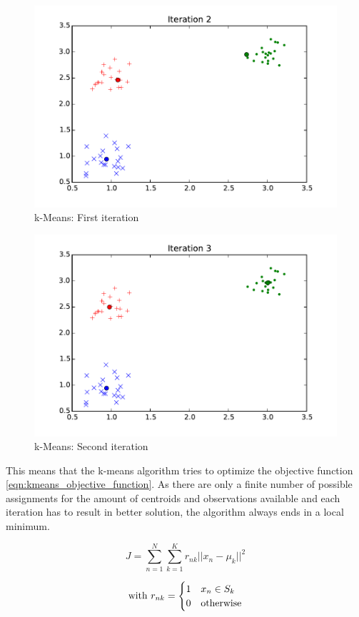 \begin{figure}
\includegraphics[width=0.7\linewidth]{images/iteration02}
\caption{k-Means: First iteration}
\label{fig:kmeans:iteration02}
\end{figure}

\begin{figure}
\includegraphics[width=0.7\linewidth]{images/iteration03}
\caption{k-Means: Second iteration}
\label{fig:kmeans:iteration03}
\end{figure}


This means that the k-means algorithm tries to optimize the objective function \ref{eqn:kmeans_objective_function}. As there are only a finite number of possible assignments for the amount of centroids and observations available and each iteration has to result in better solution, the algorithm always ends in a local minimum.

\begin{equation}
J = \sum_{n=1}^{N} \sum_{k=1}^{K} r_{nk} ||x_n - \mu_k||^2
\label{eqn:kmeans_objective_function}
\end{equation}

\[
\text{with } \\
r_{nk} = \begin{cases}
1 & x_n \in S_k \\
0 & \text{otherwise}
\end{cases}
\]

